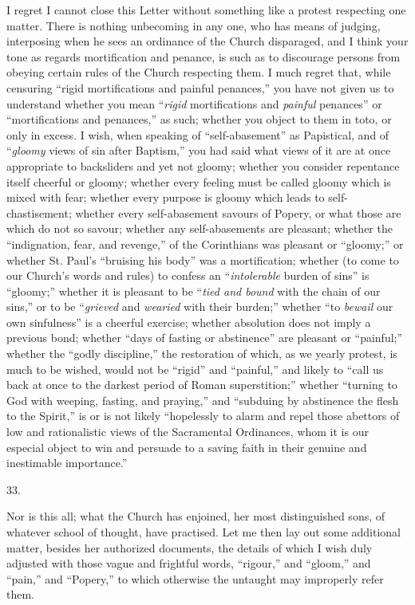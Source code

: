 I regret I cannot close this Letter without
something like a protest respecting one matter. There is nothing
unbecoming in any one, who has means of judging, interposing when he
sees an ordinance of the Church disparaged, and I think your tone as
regards mortification and penance, is such as to discourage persons
from obeying certain rules of the Church respecting them. I much
regret that, while censuring ``rigid mortifications and painful
penances,'' you have not given us to understand whether you mean ``\emph{rigid}
mortifications and \emph{painful} penances'' or ``mortifications and
penances,'' as such; whether you object to them in toto, or only in
excess. I wish, when speaking of ``self-abasement'' as Papistical, and
of ``\emph{gloomy} views of sin after Baptism,'' you had said what views
of it are at once appropriate to backsliders and yet not gloomy;
whether you consider repentance itself cheerful or gloomy; whether
every feeling must be called gloomy which is mixed with fear; whether
every purpose is gloomy which leads to self-chastisement; whether
every self-abasement savours of Popery, or what those are which do not
so savour; whether any self-abasements are pleasant; whether the ``indignation,
fear, and revenge,'' of the Corinthians was pleasant or ``gloomy;'' or
whether St. Paul's ``bruising his body'' was a mortification; whether
(to come to our Church's words and rules) to confess an ``\emph{intolerable}
burden of sins'' is ``gloomy;'' whether it is pleasant to be ``\emph{tied and
bound} with the chain of our sins,'' or to be ``\emph{grieved}
and \emph{wearied} with their burden;'' whether ``to \emph{bewail} our
own sinfulness'' is a cheerful exercise; whether absolution does not
imply a previous bond; whether ``days of fasting or abstinence'' are
pleasant or ``painful;'' whether the ``godly discipline,'' the restoration
of which, as we yearly protest, is much to be wished, would not be ``rigid''
and ``painful,'' and likely to ``call us back at once to the darkest
period of Roman superstition;'' whether ``turning to God with weeping,
fasting, and praying,'' and ``subduing by abstinence the flesh to the
Spirit,'' is or is not likely ``hopelessly to alarm and repel those
abettors of low and rationalistic views of the Sacramental Ordinances,
whom it is our especial object to win and persuade to a saving faith
in their genuine and inestimable importance.''

33.

Nor is this all; what the Church has enjoined,
her most distinguished sons, of whatever school of thought, have
practised. Let me then lay out some additional matter, besides her
authorized documents, the details of which I wish duly adjusted with
those vague and frightful words, ``rigour,'' and ``gloom,'' and ``pain,''
and ``Popery,'' to which otherwise the untaught may improperly refer
them.


